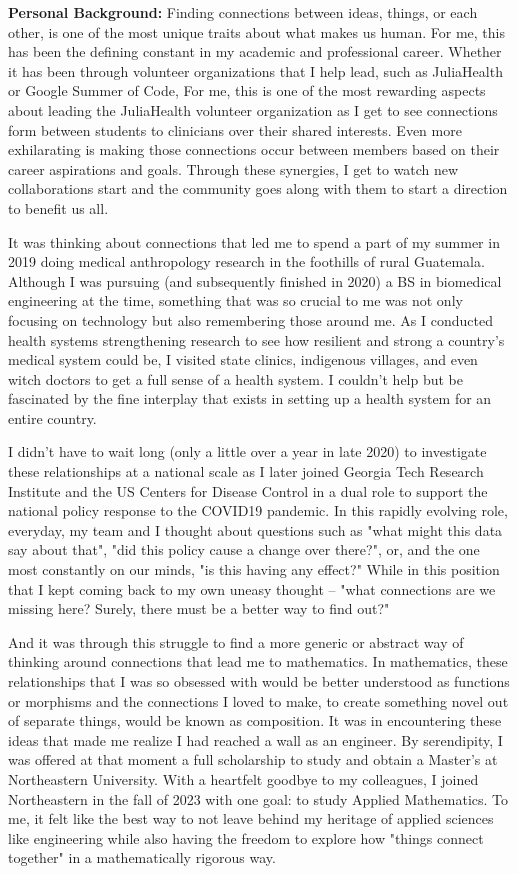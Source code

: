 \documentclass[11pt]{extarticle}
\begin{document}
\textbf{Personal Background:} Finding connections between ideas, things, or each other, is one of the most unique traits about what makes us human.
For me, this has been the defining constant in my academic and professional career.
Whether it has been through volunteer organizations that I help lead, such as JuliaHealth or Google Summer of Code, 
For me, this is one of the most rewarding aspects about leading the JuliaHealth volunteer organization as I get to see connections form between students to clinicians over their shared interests.
Even more exhilarating is making those connections occur between members based on their career aspirations and goals.
Through these synergies, I get to watch new collaborations start and the community goes along with them to start a direction to benefit us all.

It was thinking about connections that led me to spend a part of my summer in 2019 doing medical anthropology research in the foothills of rural Guatemala.
Although I was pursuing (and subsequently finished in 2020) a BS in biomedical engineering at the time, something that was so crucial to me was not only focusing on technology but also remembering those around me.
As I conducted health systems strengthening research to see how resilient and strong a country's medical system could be, I visited state clinics, indigenous villages, and even witch doctors to get a full sense of a health system.
I couldn't help but be fascinated by the fine interplay that exists in setting up a health system for an entire country.

I didn't have to wait long (only a little over a year in late 2020) to investigate these relationships at a national scale as I later joined Georgia Tech Research Institute and the US Centers for Disease Control in a dual role to support the national policy response to the COVID19 pandemic.
In this rapidly evolving role, everyday, my team and I thought about questions such as "what might this data say about that", "did this policy cause a change over there?", or, and the one most constantly on our minds, "is this having any effect?"
While in this position that I kept coming back to my own uneasy thought -- "what connections are we missing here? Surely, there must be a better way to find out?"

And it was through this struggle to find a more generic or abstract way of thinking around connections that lead me to mathematics.
In mathematics, these relationships that I was so obsessed with would be better understood as functions or morphisms and the connections I loved to make, to create something novel out of separate things, would be known as composition.
It was in encountering these ideas that made me realize I had reached a wall as an engineer.
By serendipity, I was offered at that moment a full scholarship to study and obtain a Master's at Northeastern University.
With a heartfelt goodbye to my colleagues, I joined Northeastern in the fall of 2023 with one goal: to study Applied Mathematics. 
To me, it felt like the best way to not leave behind my heritage of applied sciences like engineering while also having the freedom to explore how "things connect together" in a mathematically rigorous way.
\end{document}
